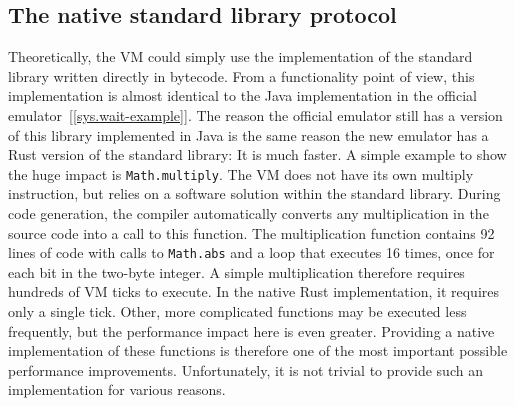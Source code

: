 \subsection{The native standard library protocol} \label{jack-stdlib-in-rust}
Theoretically, the VM could simply use the implementation of the standard library written directly in bytecode.
From a functionality point of view, this implementation is almost identical to the Java implementation in the official emulator~[\ref{sys.wait-example}].
The reason the official emulator still has a version of this library implemented in Java is the same reason the new emulator has a Rust version of the standard library:
It is much faster.
A simple example to show the huge impact is \verb+Math.multiply+.
The VM does not have its own multiply instruction, but relies on a software solution within the standard library.
During code generation, the compiler automatically converts any multiplication in the source code into a call to this function.
The multiplication function contains 92 lines of code with calls to \verb+Math.abs+ and a loop that executes 16 times, once for each bit in the two-byte integer.
A simple multiplication therefore requires hundreds of VM ticks to execute.
In the native Rust implementation, it requires only a single tick.
Other, more complicated functions may be executed less frequently, but the performance impact here is even greater.
Providing a native implementation of these functions is therefore one of the most important possible performance improvements.
Unfortunately, it is not trivial to provide such an implementation for various reasons.

